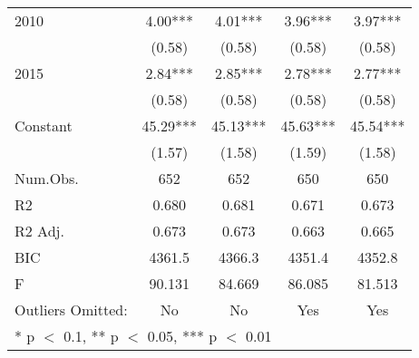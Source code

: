 \begin{table}[H]
\begin{tabular}[t]{lcccc}
2010 & 4.00*** & 4.01*** & 3.96*** & 3.97***\\
 & (0.58) & (0.58) & (0.58) & \vphantom{1} (0.58)\\
2015 & 2.84*** & 2.85*** & 2.78*** & 2.77***\\
 & (0.58) & (0.58) & (0.58) & (0.58)\\
Constant & 45.29*** & 45.13*** & 45.63*** & 45.54***\\
 & (1.57) & (1.58) & (1.59) & (1.58)\\
\midrule
Num.Obs. & 652 & 652 & 650 & 650\\
R2 & 0.680 & 0.681 & 0.671 & 0.673\\
R2 Adj. & 0.673 & 0.673 & 0.663 & 0.665\\
BIC & 4361.5 & 4366.3 & 4351.4 & 4352.8\\
F & 90.131 & 84.669 & 86.085 & 81.513\\
Outliers Omitted: & No & No & Yes & Yes\\
\bottomrule
\multicolumn{5}{l}{\textsuperscript{} * p $<$ 0.1, ** p $<$ 0.05, *** p $<$ 0.01}\\
\end{tabular}
\end{table}
